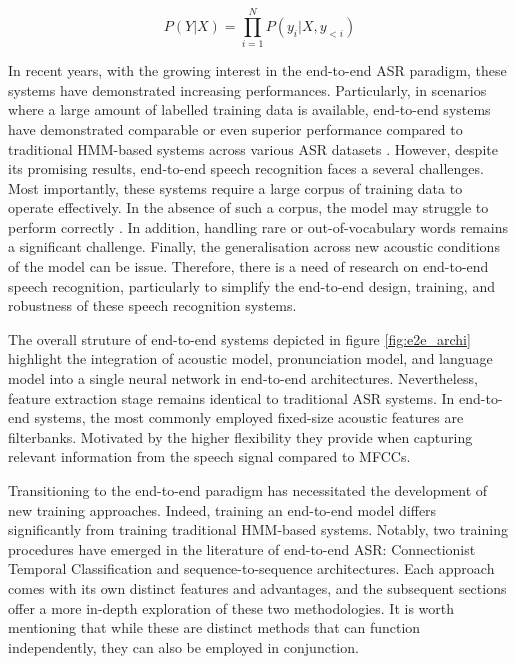  \begin{equation}
     P(Y|X) = \prod_{i=1}^{N}P(y_i | X,y_{<i})
 \end{equation}

 In recent years, with the growing interest in the end-to-end \ac{ASR} paradigm, these systems have demonstrated increasing performances. Particularly, in scenarios where a large amount of labelled training data is available,  end-to-end systems have demonstrated comparable or even superior performance compared to traditional \ac{HMM}-based systems across various \ac{ASR} datasets \cite{hannun2014deep,hmmvse2e}. However, despite its promising results, end-to-end speech recognition faces a several challenges. Most importantly, these systems require a large corpus of training data to operate effectively. In the absence of such a corpus, the model may struggle to perform correctly \cite{hmm-end2end}. In addition, handling rare or out-of-vocabulary words remains a significant challenge. Finally, the generalisation across new acoustic conditions of the model can be issue. Therefore, there is a need of research on end-to-end speech recognition, particularly to simplify the end-to-end design, training, and robustness of these speech recognition systems.
 
 The overall struture of end-to-end systems depicted in figure \ref{fig:e2e_archi} highlight the integration of acoustic model, pronunciation model, and language model into a single neural network in end-to-end architectures. Nevertheless, feature extraction stage remains identical to traditional \ac{ASR} systems. In end-to-end systems, the most commonly employed fixed-size acoustic features are filterbanks. Motivated by the higher flexibility they provide when capturing relevant information from the speech signal compared to \acp{MFCC}.

 Transitioning to the end-to-end paradigm has necessitated the development of new training approaches. Indeed, training an end-to-end model differs significantly from training traditional \ac{HMM}-based systems. Notably, two training procedures have emerged in the literature of end-to-end \ac{ASR}: Connectionist Temporal Classification and sequence-to-sequence architectures. Each approach comes with its own distinct features and advantages, and the subsequent sections offer a more in-depth exploration of these two methodologies. It is worth mentioning that while these are distinct methods that can function independently, they can also be employed in conjunction.

